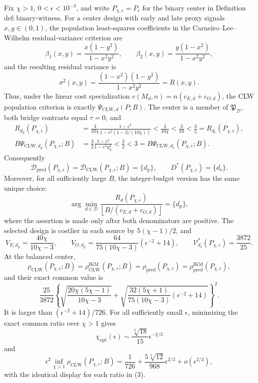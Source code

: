Fix \(\chi>1\), \(0<\epsilon<10^{-3}\), and write \(P_{\chi,\epsilon}=P_\epsilon\) for the binary center in Definition~\(\mathrm{def{:}binary\text{-}witness}\). For a center design with early and late proxy signals \(x,y\in(0,1)\), the population least-squares coefficients in the Carneiro--Lee--Wilhelm residual-variance criterion are
\[
 \beta_1(x,y)=\frac{x(1-y^2)}{1-x^2y^2},
 \qquad
 \beta_2(x,y)=\frac{y(1-x^2)}{1-x^2y^2},
\]
and the resulting residual variance is
\[
 \sigma^2(x,y)=\frac{(1-x^2)(1-y^2)}{1-x^2y^2}=R(x,y).
\]
Thus, under the linear cost specialization \(c(M_d,n)=n(c_{E,d}+c_{O,d})\), the CLW population criterion is exactly \(\Psi_{\mathrm{CLW},d}(P;B)\). The center is a member of \(\mathfrak P_{\mathcal D}\), both bridge contrasts equal \(\tau=0\), and
\[
\begin{aligned}
 R_{d_{\mathrm p}}(P_{\chi,\epsilon})
 &=\frac{3}{10\chi}\frac{1-\epsilon^2}{1-\epsilon^2(1-3/(10\chi))}
 <\frac{3}{10\chi}<\frac3{10}<\frac35
 =R_{d_{\mathrm e}}(P_{\chi,\epsilon}),\\
 B\Psi_{\mathrm{CLW},d_{\mathrm p}}(P_{\chi,\epsilon};B)
 &=\frac32\frac{1-\epsilon^2}{1-\epsilon^2y_\chi^2}
 <\frac32<3
 =B\Psi_{\mathrm{CLW},d_{\mathrm e}}(P_{\chi,\epsilon};B).
\end{aligned}                                                     \tag{1}
\]
Consequently
\[
 \mathcal D_{\mathrm{pred}}(P_{\chi,\epsilon})
 =\mathcal D_{\mathrm{CLW}}(P_{\chi,\epsilon};B)=\{d_{\mathrm p}\},
 \qquad D^*(P_{\chi,\epsilon})=\{d_{\mathrm e}\}.
\]
Moreover, for all sufficiently large \(B\), the integer-budget version has the same unique choice:
\[
 \arg\min_{d\in\mathcal D}
 \frac{R_d(P_{\chi,\epsilon})}
 {\left\lfloor B/(c_{E,d}+c_{O,d})\right\rfloor}
 =\{d_{\mathrm p}\},                                      \tag{2}
\]
where the assertion is made only after both denominators are positive. The selected design is costlier in each source by \(5(\chi-1)/2\), and
\[
 V_{E,d_{\mathrm p}}=\frac{40\chi}{10\chi-3},
 \qquad
 V_{O,d_{\mathrm p}}=\frac{64}{75(10\chi-3)}(\epsilon^{-2}+14),
 \qquad
 \mathcal V_{d_{\mathrm e}}^*(P_{\chi,\epsilon})=\frac{3872}{25}.
\]
At the balanced center,
\[
 \rho_{\mathrm{CLW}}(P_{\chi,\epsilon};B)
 =\rho_{\mathrm{CLW}}^{\mathrm{IKM}}(P_{\chi,\epsilon};B)
 =\rho_{\mathrm{pred}}(P_{\chi,\epsilon})
 =\rho_{\mathrm{pred}}^{\mathrm{IKM}}(P_{\chi,\epsilon}),          \tag{3}
\]
and their exact common value is
\[
 \frac{25}{3872}
 \left\{
 \sqrt{\frac{20\chi(5\chi-1)}{10\chi-3}}
 +\sqrt{\frac{32(5\chi+1)}{75(10\chi-3)}(\epsilon^{-2}+14)}
 \right\}^{2}.                                             \tag{4}
\]
It is larger than \((\epsilon^{-2}+14)/726\). For all sufficiently small \(\epsilon\), minimizing the exact common ratio over \(\chi>1\) gives
\[
 \chi_{\mathrm{opt}}(\epsilon)\sim\frac{\sqrt[3]{18}}{15}\epsilon^{-2/3}
\]
and
\[
 \epsilon^2\inf_{\chi>1}\rho_{\mathrm{CLW}}(P_{\chi,\epsilon};B)
 =\frac1{726}+\frac{5\sqrt[3]{12}}{968}\epsilon^{2/3}+o(\epsilon^{2/3}), \tag{5}
\]
with the identical display for each ratio in (3).